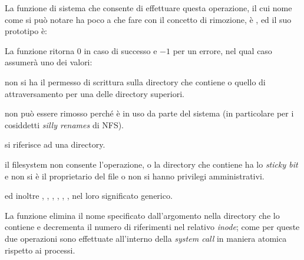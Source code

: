 La funzione di sistema che consente di effettuare questa operazione, il cui
nome come si può notare ha poco a che fare con il concetto di rimozione, è
, ed il suo prototipo è:

\begin{funcproto}{
}
{La funzione ritorna $0$ in caso di successo e $-1$ per un errore,
  nel qual caso  assumerà uno dei valori:\footnotemark  
  \begin{errlist}
  \item[\errcode{EACCES}] non si ha il permesso di scrittura sulla directory
    che contiene  o quello di attraversamento per una delle
    directory superiori.
  \item[\errcode{EBUSY}]  non può essere rimosso perché è in
    uso da parte del sistema (in particolare per i cosiddetti \textit{silly
      renames} di NFS).
  \item[\errcode{EISDIR}]  si riferisce ad una
    directory.
  \item[\errcode{EPERM}] il filesystem non consente l'operazione, o la
    directory che contiene  ha lo \textit{sticky bit} e non si
    è il proprietario del file o non si hanno privilegi amministrativi. 
  \end{errlist} ed inoltre , , ,
  , , ,  nel loro
  significato generico.}
\end{funcproto}


La funzione elimina il nome specificato dall'argomento  nella
directory che lo contiene e decrementa il numero di riferimenti nel relativo
\textit{inode}; come per  queste due operazioni sono effettuate
all'interno della \textit{system call} in maniera atomica rispetto ai
processi.

